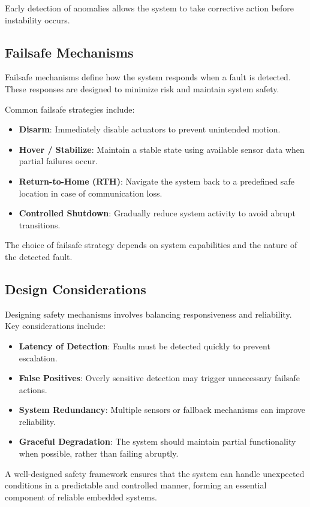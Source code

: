 Early detection of anomalies allows the system to take corrective action before instability occurs.

\subsection{Failsafe Mechanisms}

Failsafe mechanisms define how the system responds when a fault is detected. These responses are designed to minimize risk and maintain system safety.

Common failsafe strategies include:

\begin{itemize}
    \item \textbf{Disarm}:  
    Immediately disable actuators to prevent unintended motion.

    \item \textbf{Hover / Stabilize}:  
    Maintain a stable state using available sensor data when partial failures occur.

    \item \textbf{Return-to-Home (RTH)}:  
    Navigate the system back to a predefined safe location in case of communication loss.

    \item \textbf{Controlled Shutdown}:  
    Gradually reduce system activity to avoid abrupt transitions.
\end{itemize}

The choice of failsafe strategy depends on system capabilities and the nature of the detected fault.

\subsection{Design Considerations}

Designing safety mechanisms involves balancing responsiveness and reliability. Key considerations include:

\begin{itemize}
    \item \textbf{Latency of Detection}:  
    Faults must be detected quickly to prevent escalation.

    \item \textbf{False Positives}:  
    Overly sensitive detection may trigger unnecessary failsafe actions.

    \item \textbf{System Redundancy}:  
    Multiple sensors or fallback mechanisms can improve reliability.

    \item \textbf{Graceful Degradation}:  
    The system should maintain partial functionality when possible, rather than failing abruptly.
\end{itemize}

A well-designed safety framework ensures that the system can handle unexpected conditions in a predictable and controlled manner, forming an essential component of reliable embedded systems.